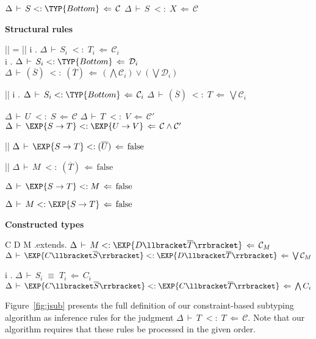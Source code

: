 \documentclass[10pt]{sigplanconf}
\renewcommand{\bar}{\overline}
\newcommand{\C}{\mathcal{C}}
\newcommand{\subtypeof}{\ensuremath{<:}}
\newcommand{\D}{\ensuremath{\mathcal{D}}}
\newcommand{\Bottom}{\TYP{Bottom}}
\newcommand{\FALSE}{\textrm{false}}
\newcommand{\jgconstrtemplate}[5][\Delta]{\ensuremath{{#1}\,\vdash\,{#2}\;{#3}\;{#4}\,\Leftarrow\,{#5}}}
\newcommand{\jsub}[4][\Delta]{\jgconstrtemplate[#1]{#2}{\subtypeof}{#3}{#4}}
\newcommand{\jequiv}[4][\Delta]{\jgconstrtemplate[#1]{#2}{\equiv}{#3}{#4}}
\begin{document}
\begin{figure*}[htbp]
\begin{minipage}[t]{.5\textwidth}
\infrule
  {\jsub{S}{\Bottom}{\C}}
  {\jsub{S}{X}{\C}}

\end{minipage}%
\begin{minipage}[t]{.5\textwidth}
\centering
\textbf{Structural rules}

\infrule
  {|\bar{S}| = |\bar{T}| \andalso \forall  i . \quad \jsub{S_i}{T_i}{\C_i} \\
   \forall i . \quad \jsub{S_i}{\Bottom}{\D_i}}
  {\jsub{(\bar{S})}{(\bar{T})}{(\bigwedge \C_i) \vee (\bigvee \D_i)}}

\infrule
  {|\bar{S}|  \andalso \forall i . \quad \jsub{S_i}{\Bottom}{\C_i}}
  {\jsub{(\bar{S})}{T}{\bigvee \C_i}}

\infrule
  {\jsub{U}{S}{\C} \andalso \jsub{T}{V}{\C'}}
  {\jsub{\EXP{S \rightarrow T}}{\EXP{U \rightarrow V}}{\C \wedge \C'}}
  
\infrule
  {|\bar{U}| }
  {\jsub{\EXP{S \rightarrow T}}{(\bar{U})}{\FALSE}}
  
\infrule
  {|\bar{T}| }
  {\jsub{M}{(\bar{T})}{\FALSE}}

\infrule
  {}
  {\jsub{\EXP{S \rightarrow T}}{M}{\FALSE}}

\infrule
  {}
  {\jsub{M}{\EXP{S \rightarrow T}}{\FALSE}}

\vspace*{2ex}
\textbf{Constructed types}

\infrule
  {C \neq D \andalso \forall M \in \EXP{C\llbracket\bar{S}\rrbracket}.extends. \quad \jsub{M}{\EXP{D\llbracket\bar{T}\rrbracket}}{\C_M}}
  {\jsub{\EXP{C\llbracket\bar{S}\rrbracket}}{\EXP{D\llbracket\bar{T}\rrbracket}}{\bigvee \C_M}}

\infrule
  {\forall i . \quad \jequiv{S_i}{T_i}{C_i}}
  {\jsub{\EXP{C\llbracket\bar{S}\rrbracket}}{\EXP{C\llbracket\bar{T}\rrbracket}}{\bigwedge C_i}}

\end{minipage}

  \caption{Algorithm for generating subtyping constraints. Apply the first rule that matches.}
  \label{fig:jsub}
\end{figure*}


Figure~\ref{fig:jsub} presents the full definition of our constraint-based subtyping algorithm
as inference rules for the judgment $\jsub{T}{T}{\C}$. Note that our algorithm requires that these rules be processed in the given order.
\end{document}
